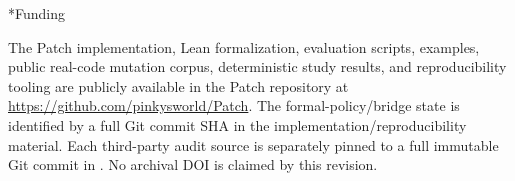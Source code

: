 \long{}{%
The Patch implementation, Lean formalization, evaluation scripts, examples, public real-code mutation corpus, deterministic study results, and reproducibility tooling are publicly available in the Patch repository at \url{https://github.com/pinkysworld/Patch}. The formal-policy/bridge state is identified by a full Git commit SHA in the implementation/reproducibility material. Each third-party audit source is separately pinned to a full immutable Git commit in . No archival DOI is claimed by this revision.

%
}

\newcommand{\PatchSectionNoStar}[1]{%
  \ifstrequal{#1}{Implementation and Reproducibility}{}{}%
  \ifstrequal{#1}{Conclusion}{%
    \PatchOriginalSection{#1}\PatchReplaceConclusion
  }{%
    \PatchOriginalSection{#1}%
  }%
}

\newcommand{\PatchSectionStar}[1]{\PatchOriginalSection*{#1}}


\makeatother


